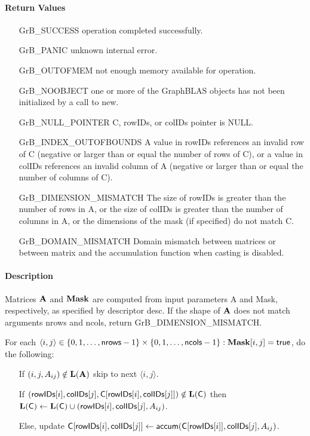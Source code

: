 \paragraph{Return Values}

\begin{itemize}[leftmargin=2.1in]
\item[{\sf GrB\_SUCCESS}]      operation completed successfully.
\item[{\sf GrB\_PANIC}]        unknown internal error.
\item[{\sf GrB\_OUTOFMEM}]     not enough memory available for operation.
\item[{\sf GrB\_NOOBJECT}]          one or more of the GraphBLAS objects has
                                    not been initialized by a call to {\sf new}.
\item[{\sf GrB\_NULL\_POINTER}]    {\sf C}, {\sf rowIDs}, or {\sf colIDs} pointer is {\sf NULL}.
\item[{\sf GrB\_INDEX\_OUTOFBOUNDS}]
        A value in {\sf rowIDs} references an invalid row of {\sf C} (negative or larger than or equal the number of rows of {\sf C}),
        or a value in {\sf colIDs} references an invalid column of {\sf A} (negative or larger than or equal the number of columns of {\sf C}).
\item[{\sf GrB\_DIMENSION\_MISMATCH}] 
        The size of {\sf rowIDs} is greater than the number of rows in {\sf A}, or
        the size of {\sf colIDs} is greater than the number of columns in {\sf A}, or
        the dimensions of the mask (if specified) do not match {\sf C}.
\item[\sf GrB\_DOMAIN\_MISMATCH]  
       Domain mismatch between matrices or between matrix and the accumulation function when casting is disabled.
\end{itemize}

\paragraph{Description}

Matrices ${\bf A}$ and ${\bf Mask}$ are computed from input parameters {\sf A} and {\sf Mask}, respectively,
as specified by descriptor {\sf desc}. If the shape of ${\bf A}$ does not match arguments {\sf nrows} and {\sf ncols},
return {\sf GrB\_DIMENSION\_MISMATCH}.

For each $\langle i,j \rangle \in \{0, 1, \ldots, {\sf nrows}-1 \} \times \{0, 1, \ldots, {\sf ncols}-1 \} : {\bf Mask}[i,j] = {\sf true}$, do the following:
\begin{itemize}
	\item[] If $(i,j,A_{ij}) \notin \bold{L}({\bf A})$ skip to next $\langle i,j \rangle$.
	\item[] If $({\sf rowIDs}[i], {\sf colIDs}[j], {\sf C}[{\sf rowIDs}[i],{\sf colIDs}[j]]) \notin \bold{L}({\sf C})$ then
	      $\bold{L}({\sf C}) \leftarrow \bold{L}({\sf C}) \cup ({\sf rowIDs}[i],{\sf colIDs}[j],A_{ij})$.
	\item[]  Else, update ${\sf C}[{\sf rowIDs}[i],{\sf colIDs}[j]] \leftarrow {\sf accum}({\sf C}[{\sf rowIDs}[i]],{\sf colIDs}[j],A_{ij})$.
\end{itemize}

